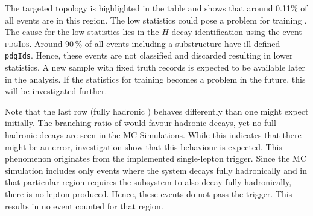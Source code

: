\documentclass[bachelor,ngerman,english]{GAUBM}
\begin{document}
The targeted topology is highlighted in the table and shows that around 0.11\% of all events are in this region. The low statistics could pose a problem for training \spanet. The cause for the low statistics lies in the $H$ decay identification using the event \textsc{pdgIds}. Around 90\,\% of all events including a \HWW substructure have ill-defined \texttt{pdgIds}. Hence, these events are not classified and discarded resulting in lower statistics. A new sample with fixed truth records is expected to be available later in the analysis. If the statistics for training \spanet becomes a problem in the future, this will be investigated further.

Note that the last row (fully hadronic \HWW) behaves differently than one might expect initially. The branching ratio of \wbosons would favour hadronic decays, yet no full hadronic decays are seen in the MC Simulations. While this indicates that there might be an error, investigation show that this behaviour is expected. This phenomenon originates from the implemented single-lepton trigger. Since the MC simulation includes only events where the \ttbar system decays fully hadronically and in that particular region requires the \HWW subsystem to also decay fully hadronically, there is no lepton produced. Hence, these events do not pass the trigger. This results in no event counted for that region. %
\end{document}
